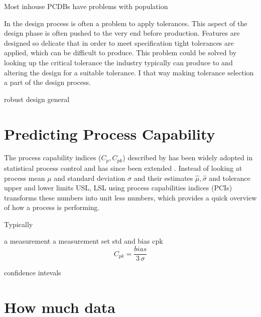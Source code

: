 \documentclass[aip,amsmath, reprint, author-year]{revtex4-1}
\begin{document}
 Most inhouse PCDBs have problems with population


In the design process is often a problem to apply tolerances. This aspect of the design phase is often pushed to the very end before production. Features are designed so delicate that in order to meet specification tight tolerances are applied, which can be difficult to produce.
This problem could be solved by looking up the critical tolerance the industry typically can produce to and altering the design for a suitable tolerance.  I that way making tolerance selection a part of the design process.

robust design general

\section{Predicting Process Capability}
The process capability indices ($C_p, C_{pk}$) described by \cite{kane1986process} has been widely adopted in statistical process control and has since been extended \citep{wu2009overview}. 
Instead of looking at process mean $\mu$ and standard deviation $\sigma$ and their estimates $\hat{\mu}, \hat{\sigma}$ and tolerance upper and lower limits USL, LSL using process capabilities indices  (PCIs) transforms these numbers into unit less numbers, which provides a quick overview of how a process is performing.


Typically 

\cite{tang1997graphical}

a measurement
a measurement set
std and bias
cpk 
\begin{equation}
C_{pk} = \frac{bias}{3 \, \sigma}
\label{eq:sddj}
\end{equation}


confidence intevals

\section{How much data}
\end{document}
